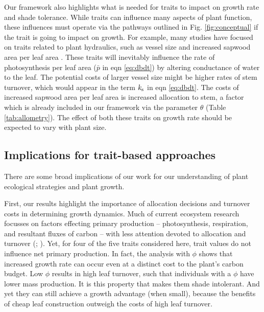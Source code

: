 \documentclass[a4paper,11pt]{article}
\begin{document}
Our framework also highlights what is needed for traits to impact on growth rate and shade tolerance. While traits can influence many aspects of plant function, these  influences must operate via the pathways outlined in Fig. \ref{fig:conceptual} if the trait is going to impact on growth. For example, many studies have focused on traits related to plant hydraulics, such as vessel size and increased sapwood area per leaf area \citep{Zanne-2010}. These traits will inevitably influence the rate of photosynthesis per leaf area ($\bar{p}$ in eqn \ref{eq:dbdt}) by altering conductance of water to the leaf. The potential costs of larger vessel size might be higher rates of stem turnover, which would appear in the term $k_{\rm s}$ in eqn \ref{eq:dbdt}. The costs of increased sapwood area per leaf area is increased allocation to stem, a factor which is already included in our framework via the parameter $\theta$ (Table \ref{tab:allometry}). The effect of both these traits on growth rate should be expected to vary with plant size.


\subsection{Implications for trait-based approaches}

There are some broad implications of our work for our understanding of plant ecological strategies and plant growth.

First, our results highlight the importance of allocation decisions and turnover costs in determining growth dynamics.
Much of current ecosystem research focusses on factors effecting primary production -- photosynthesis, respiration, and resultant fluxes of carbon -- with less attention devoted to allocation and turnover (\citealp{Friend-2014}; \citealp[for comparisons of models see][]{Sitch-2008, DeKauwe-2014}). Yet, for four of the five traits considered here, trait values do not influence net primary production. In fact, the analysis with $\phi$ shows that increased growth rate can occur even at a distinct cost to the plant's carbon budget. Low $\phi$ results in high leaf turnover, such that individuals with a $\phi$ have lower mass production. It is this property that makes them shade intolerant. And yet they can still achieve a growth advantage (when small), because the benefits of cheap leaf construction outweigh the costs of high leaf turnover.
\end{document}
